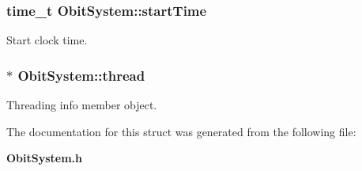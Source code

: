 \subsubsection{\setlength{\rightskip}{0pt plus 5cm}time\_\-t {\bf Obit\-System::start\-Time}}\label{structObitSystem_o15}


Start clock time. 

\subsubsection{$\ast$ {\bf Obit\-System::thread}}\label{structObitSystem_o4}


Threading info member object. 



The documentation for this struct was generated from the following file:\begin{CompactItemize}
\item 
{\bf Obit\-System.h}\end{CompactItemize}
